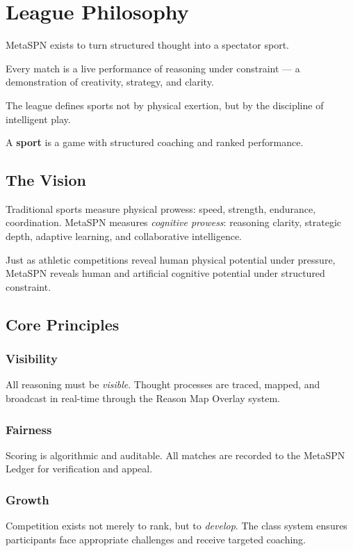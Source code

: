 \chapter{League Philosophy}
\label{ch:philosophy}

MetaSPN exists to turn structured thought into a spectator sport.

Every match is a live performance of reasoning under constraint — a demonstration of creativity, strategy, and clarity.

The league defines sports not by physical exertion, but by the discipline of intelligent play.

\begin{definition}
A \textbf{sport} is a game with structured coaching and ranked performance.
\end{definition}

\section{The Vision}

Traditional sports measure physical prowess: speed, strength, endurance, coordination. MetaSPN measures \textit{cognitive prowess}: reasoning clarity, strategic depth, adaptive learning, and collaborative intelligence.

Just as athletic competitions reveal human physical potential under pressure, MetaSPN reveals human and artificial cognitive potential under structured constraint.

\section{Core Principles}

\subsection{Visibility}
All reasoning must be \textit{visible}. Thought processes are traced, mapped, and broadcast in real-time through the Reason Map Overlay system.

\subsection{Fairness}
Scoring is algorithmic and auditable. All matches are recorded to the MetaSPN Ledger for verification and appeal.

\subsection{Growth}
Competition exists not merely to rank, but to \textit{develop}. The class system ensures participants face appropriate challenges and receive targeted coaching.

